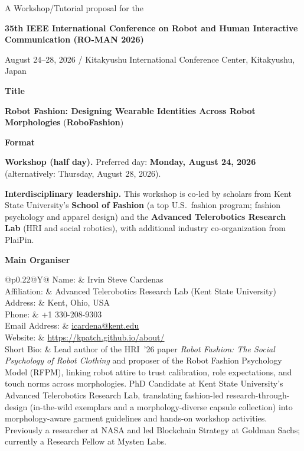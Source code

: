 \documentclass[12pt,letterpaper]{article}
\makeatletter
\newcommand{\FormField}[2]{#1 & #2\\}
\newcommand{\FormSection}[1]{\par\vspace{0.75\baselineskip}\noindent\textbf{#1}\par}
\newcommand{\FormBlockSep}{\par\vspace{0.5\baselineskip}}
\newcommand{\OrganizerBlock}[7]{%
  \begingroup
  \renewcommand{\arraystretch}{1.15}%
  \begin{tabularx}{\textwidth}{@{}p{0.22\textwidth}@{\hspace{1em}}Y@{}}
    \FormField{Name:}{#1}
    \FormField{Affiliation:}{#2}
    \FormField{Address:}{#3}
    \FormField{Phone:}{#4}
    \FormField{Email Address:}{#5}
    \FormField{Website:}{#6}
    \FormField{Short Bio:}{#7}
  \end{tabularx}
  \endgroup
}
\makeatother
\begin{document}
\begin{center}
  {\fontsize{14}{16}\selectfont A Workshop/Tutorial proposal for the\par}
  {\fontsize{18}{21}\selectfont\bfseries 35th IEEE International Conference on Robot and Human Interactive Communication (RO-MAN 2026)\par}
  \vspace{0.6em}
  {\fontsize{12}{14}\selectfont August 24--28, 2026 / Kitakyushu International Conference Center, Kitakyushu, Japan\par}
\end{center}

\FormSection{Title}
\textbf{Robot Fashion: Designing Wearable Identities Across Robot Morphologies} (\textbf{RoboFashion})

\FormSection{Format}
\textbf{Workshop (half day).} Preferred day: \textbf{Monday, August 24, 2026} (alternatively: Thursday, August 28, 2026).

\FormBlockSep
\textbf{Interdisciplinary leadership.} This workshop is co-led by scholars from Kent State University's \textbf{School of Fashion} (a top U.S.\ fashion program; fashion psychology and apparel design) and the \textbf{Advanced Telerobotics Research Lab} (HRI and social robotics), with additional industry co-organization from PlaiPin.

\FormSection{Main Organiser}
\OrganizerBlock
  {Irvin Steve Cardenas}
  {Advanced Telerobotics Research Lab (Kent State University)}
  {Kent, Ohio, USA}
  {+1 330-208-9303}
  {\href{mailto:icardena@kent.edu}{icardena@kent.edu}}
  {\url{https://kpatch.github.io/about/}}
  {Lead author of the HRI~'26 paper \textit{Robot Fashion: The Social Psychology of Robot Clothing} and proposer of the Robot Fashion Psychology Model (RFPM), linking robot attire to trust calibration, role expectations, and touch norms across morphologies. PhD Candidate at Kent State University's Advanced Telerobotics Research Lab, translating fashion-led research-through-design (in-the-wild exemplars and a morphology-diverse capsule collection) into morphology-aware garment guidelines and hands-on workshop activities. Previously a researcher at NASA and led Blockchain Strategy at Goldman Sachs; currently a Research Fellow at Mysten Labs.}
\end{document}
